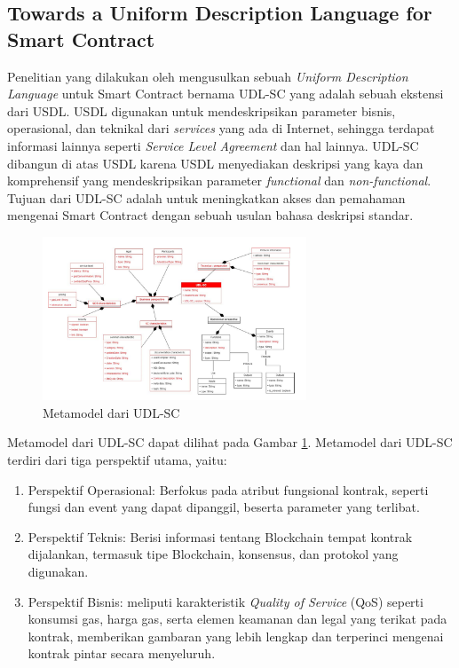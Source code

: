 \subsection{Towards a Uniform Description Language for Smart Contract}
\label{subsec:uniform-description-language}

Penelitian yang dilakukan oleh \cite{udlsc} mengusulkan sebuah \textit{Uniform Description Language} untuk Smart Contract bernama UDL-SC yang adalah sebuah ekstensi dari USDL. USDL digunakan untuk mendeskripsikan parameter bisnis, operasional, dan teknikal dari \textit{services} yang ada di Internet, sehingga terdapat informasi lainnya seperti \textit{Service Level Agreement} dan hal lainnya. UDL-SC dibangun di atas USDL karena USDL menyediakan deskripsi yang kaya dan komprehensif yang mendeskripsikan parameter \textit{functional} dan \textit{non-functional}. Tujuan dari UDL-SC adalah untuk meningkatkan akses dan pemahaman mengenai Smart Contract dengan sebuah usulan bahasa deskripsi standar.

\begin{figure}[ht]
  \centering
  \includegraphics[width=0.7\textwidth]{resources/chapter-2/metamodel-udl-sc.png}
  \caption{Metamodel dari UDL-SC \parencite{udlsc}}
  \label{image:metamodel-udl-sc}
\end{figure}

Metamodel dari UDL-SC dapat dilihat pada Gambar \ref{image:metamodel-udl-sc}. Metamodel dari UDL-SC terdiri dari tiga perspektif utama, yaitu:

\begin{enumerate}
  \item Perspektif Operasional: Berfokus pada atribut fungsional kontrak, seperti fungsi dan event yang dapat dipanggil, beserta parameter yang terlibat.
  \item Perspektif Teknis: Berisi informasi tentang Blockchain tempat kontrak dijalankan, termasuk tipe Blockchain, konsensus, dan protokol yang digunakan.
  \item Perspektif Bisnis: meliputi karakteristik \textit{Quality of Service} (QoS) seperti konsumsi gas, harga gas, serta elemen keamanan dan legal yang terikat pada kontrak, memberikan gambaran yang lebih lengkap dan terperinci mengenai kontrak pintar secara menyeluruh.
\end{enumerate}

